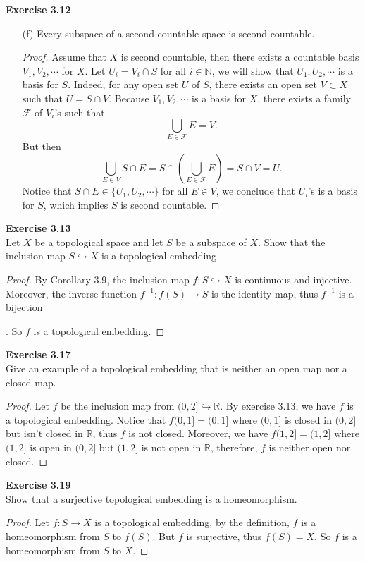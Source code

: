 \documentclass[12pt, a4paper]{article}
\theoremstyle{plain}
\newcommand{\N}{\mathbb{N}}
\newcommand{\R}{\mathbb{R}}
\newcommand{\F}{\mathcal{F}}
\newenvironment{exercise}[2][Exercise]
    { \begin{mdframed}[backgroundcolor=gray!20] \textbf{#1 #2} \\}
    {  \end{mdframed}}
\begin{document}
\begin{exercise}{3.12}
\begin{enumerate}
\item[(f)] Every subspace of a second countable space is second countable.
	\begin{proof}
	Assume that $X$ is second countable, then there exists a countable basis $V_1,V_2,\cdots$ for $X$. Let $U_i=V_i\cap S$ for all $i\in \N$, we will show that $U_1,U_2,\cdots$ is a basis for $S$. Indeed, for any open set $U$ of $S$, there exists an open set $V\subset X$ such that $U=S\cap V$. Because $V_1,V_2,\cdots$ is a basis for $X$, there exists a family $\F$ of $V_i$'s such that 
	\[
	\bigcup_{E\in\F}E=V.
	\]
	But then 
	\[
	\bigcup_{E\in V}S\cap E=S\cap\left(\bigcup_{E\in \F}E \right)=S\cap V=U.
	\]
	Notice that $S\cap E\in\{U_1,U_2,\cdots\}$ for all $E\in V$, we conclude that $U_i$'s is a basis for $S$, which implies $S$ is second countable.
	\end{proof}
\end{enumerate}
\end{exercise}

\begin{exercise}{3.13}
Let $X$ be a topological space and let $S$ be a subspace of $X$. Show that the inclusion map $S\hookrightarrow X$ is a topological embedding
\end{exercise}
	\begin{proof}
	By Corollary 3.9, the inclusion map $f:S\hookrightarrow X$ is continuous and injective. Moreover, the inverse function $f^{-1}:f(S)\rightarrow S$ is the identity map, thus $f^{-1}$ is a bijection
	
	. So $f$ is a topological embedding.
	\end{proof}
	
\begin{exercise}{3.17}
Give an example of a topological embedding that is neither an open map nor a closed map.
\end{exercise}
	\begin{proof}
	Let $f$ be the inclusion map from $(0,2]\hookrightarrow \R$. By exercise 3.13, we have $f$ is a topological embedding. Notice that $f(0,1]=(0,1]$ where $(0,1]$ is closed in $(0,2]$ but isn't closed in $\R$, thus $f$ is not closed. Moreover, we have $f(1,2]=(1,2]$ where $(1,2]$ is open in $(0,2]$ but $(1,2]$ is not open in $\R$, therefore, $f$ is neither open nor closed.
	\end{proof}
	
\begin{exercise}{3.19}
Show that a surjective topological embedding is a homeomorphism.
\end{exercise}
	\begin{proof}
	Let $f:S\rightarrow X$ is a topological embedding, by the definition, $f$ is a homeomorphism from $S$ to $f(S)$. But $f$ is surjective, thus $f(S)=X$. So $f$ is a homeomorphism from $S$ to $X$.
	\end{proof}
	
\end{document}
